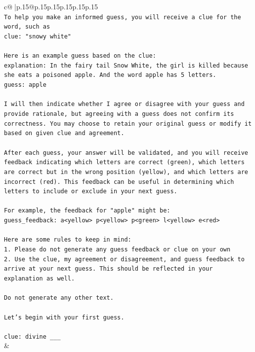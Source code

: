 \documentclass{article}
\begin{document}
{\begin{supertabular}{c@{$\;$}|p{.15\linewidth}@{}p{.15\linewidth}p{.15\linewidth}p{.15\linewidth}p{.15\linewidth}p{.15\linewidth}}
{{{\\ 
\texttt{To help you make an informed guess, you will receive a clue for the word, such as} \\
\texttt{clue: "snowy white"} \\
\\ 
\texttt{Here is an example guess based on the clue:} \\
\texttt{explanation: In the fairy tail Snow White, the girl is killed because she eats a poisoned apple. And the word apple has 5 letters.} \\
\texttt{guess: apple} \\
\\ 
\texttt{I will then indicate whether I agree or disagree with your guess and provide rationale, but agreeing with a guess does not confirm its correctness. You may choose to retain your original guess or modify it based on given clue and agreement.} \\
\\ 
\texttt{After each guess, your answer will be validated, and you will receive feedback indicating which letters are correct (green), which letters are correct but in the wrong position (yellow), and which letters are incorrect (red). This feedback can be useful in determining which letters to include or exclude in your next guess.} \\
\\ 
\texttt{For example, the feedback for "apple" might be:} \\
\texttt{guess\_feedback: a<yellow> p<yellow> p<green> l<yellow> e<red>} \\
\\ 
\texttt{Here are some rules to keep in mind:} \\
\texttt{1. Please do not generate any guess feedback or clue on your own} \\
\texttt{2. Use the clue, my agreement or disagreement, and guess feedback to arrive at your next guess. This should be reflected in your explanation as well.} \\
\\ 
\texttt{Do not generate any other text.} \\
\\ 
\texttt{Let's begin with your first guess.} \\
\\ 
\texttt{clue: divine \_\_\_} \\
            }
        }
    }
    & \\ \\


\end{supertabular}}
\end{document}
